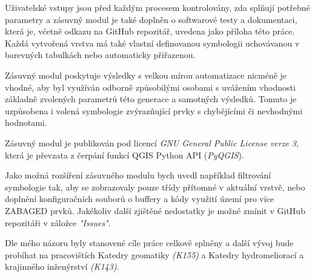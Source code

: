 \documentclass[a4paper,oneside,12pt]{book}
\begin{document}
\hspace{10mm} Uživatelské vstupy jsou před každým procesem kontrolovány, zda splňují potřebné parametry a zásuvný modul je také doplněn o softwarové testy a dokumentaci, která je, včetně odkazu na GitHub repozitář, uvedena jako příloha této práce. Každá vytvořená vrstva má také vlastní definovanou symbologii uchovávanou v barevných tabulkách nebo automaticky přiřazenou.

\hspace{10mm} Zásuvný modul poskytuje výsledky s velkou mírou automatizace nicméně je vhodné, aby byl využíván odborně způsobilými osobami s uvážením vhodnosti základně zvolených parametrů této generace a samotných výsledků. Tomuto je uzpůsobena i volená symbologie zvýrazňující prvky s chybějícími či nevhodnými hodnotami.

\hspace{10mm} Zásuvný modul je publikován pod licencí \textit{GNU General Public License verze 3}, která je převzata z čerpání funkcí QGIS Python API (\textit{PyQGIS}).

\hspace{10mm} Jako možná rozšíření zásuvného modulu bych uvedl například filtrování symbologie tak, aby se zobrazovaly pouze třídy přítomné v aktuální vrstvě, nebo doplnění konfiguračních souborů o buffery a kódy využití území pro více ZABAGED prvků. Jakékoliv další zjištěné nedostatky je možné zmínit v GitHub repozitáři v záložce \textit{"Issues"}.

\hspace{10mm} Dle mého názoru byly stanovené cíle práce celkově splněny a další vývoj bude probíhat na pracovištích Katedry geomatiky \textit{(K155)} a Katedry hydromeliorací a krajinného inženýrství \textit{(K143)}.


\clearpage  %
  \label{zdroje}
\end{document}
